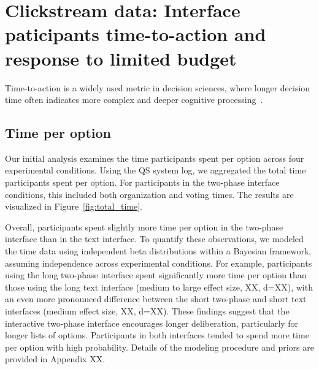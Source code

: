 \section{Clickstream data: Interface paticipants time-to-action and response to limited budget}
Time-to-action is a widely used metric in decision sciences, where longer decision time often indicates more complex and deeper cognitive processing~\cite{payneAdaptiveDecisionMaker1993}.

\subsection{Time per option}
Our initial analysis examines the time participants spent per option across four experimental conditions. Using the QS system log, we aggregated the total time participants spent per option. For participants in the two-phase interface conditions, this included both organization and voting times. The results are visualized in Figure~\ref{fig:total_time}.

Overall, participants spent slightly more time per option in the two-phase interface than in the text interface. To quantify these observations, we modeled the time data using independent beta distributions within a Bayesian framework, assuming independence across experimental conditions. For example, participants using the long two-phase interface spent significantly more time per option than those using the long text interface (medium to large effect size, XX, d=XX), with an even more pronounced difference between the short two-phase and short text interfaces (medium effect size, XX, d=XX). These findings suggest that the interactive two-phase interface encourages longer deliberation, particularly for longer lists of options. Participants in both interfaces tended to spend more time per option with high probability. Details of the modeling procedure and priors are provided in Appendix XX.

